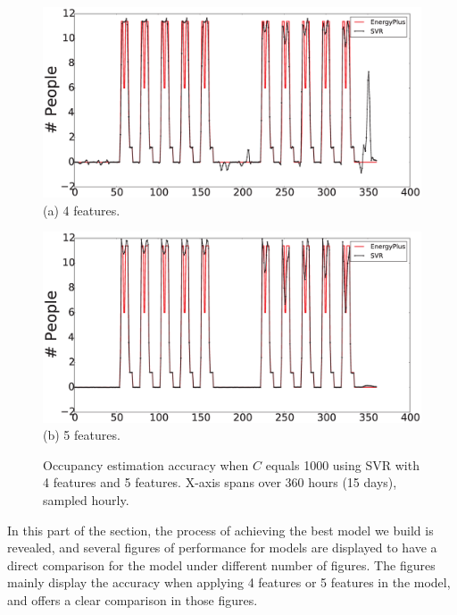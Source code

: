 \begin{figure}[h]
\begin{minipage}{\textwidth}
\centering\includegraphics[width=5in]{./Pics/1000C4Features.eps}
(a) 4 features.
\end{minipage}
\hfill

\vspace{3ex}

\noindent\begin{minipage}{\textwidth}
\centering\includegraphics[width=5in]{./Pics/1000C5Features.eps}
(b) 5 features.
\end{minipage}
\hfill
\caption{\textcolor{feb18rev}{Occupancy estimation accuracy when $C$ equals 1000 using SVR with 4
    features and 5 features. X-axis spans over 360 hours (15 days), sampled
    hourly.}}\label{fig:compare3}
\end{figure}


In this part of the section, the process of achieving the best model we build
is revealed, and several figures of performance for models are displayed to
have a direct comparison for the model under different number of figures. The
figures mainly display the accuracy when applying 4 features or 5 features in
the model, and offers a clear comparison in those figures.

